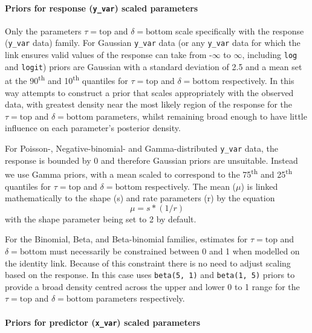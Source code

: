 \documentclass[
]{jss}
\begin{document}
\hypertarget{priors-for-response-y_var-scaled-parameters}{%
\paragraph{\texorpdfstring{Priors for response (\texttt{y\_var}) scaled
parameters}{Priors for response (y\_var) scaled parameters}}\label{priors-for-response-y_var-scaled-parameters}}

Only the parameters \(\tau = \text{top}\) and \(\delta = \text{bottom}\)
scale specifically with the response (\texttt{y\_var} data) family. For
Gaussian \texttt{y\_var} data (or any \texttt{y\_var} data for which the
link ensures valid values of the response can take from -\(\infty\) to
\(\infty\), including \texttt{log} and \texttt{logit}) priors are
Gaussian with a standard deviation of 2.5 and a mean set at the
90\textsuperscript{th} and 10\textsuperscript{th} quantiles for
\(\tau = \text{top}\) and \(\delta = \text{bottom}\) respectively. In
this way  attempts to construct a prior that scales
appropriately with the observed data, with greatest density near the
most likely region of the response for the \(\tau = \text{top}\) and
\(\delta = \text{bottom}\) parameters, whilst remaining broad enough to
have little influence on each parameter's posterior density.

For Poisson-, Negative-binomial- and Gamma-distributed \texttt{y\_var}
data, the response is bounded by 0 and therefore Gaussian priors are
unsuitable. Instead we use Gamma priors, with a mean scaled to
correspond to the 75\textsuperscript{th} and 25\textsuperscript{th}
quantiles for \(\tau = \text{top}\) and \(\delta = \text{bottom}\)
respectively. The mean (\(\mu\)) is linked mathematically to the shape
(s) and rate parameters (r) by the equation \[ \mu = s * (1/r) \] with
the shape parameter being set to 2 by default.

For the Binomial, Beta, and Beta-binomial families, estimates for
\(\tau = \text{top}\) and \(\delta = \text{bottom}\) must necessarily be
constrained between 0 and 1 when modelled on the identity link. Because
of this constraint there is no need to adjust scaling based on the
response. In this case  uses \texttt{beta(5,\ 1)} and
\texttt{beta(1,\ 5)} priors to provide a broad density centred across
the upper and lower 0 to 1 range for the \(\tau = \text{top}\) and
\(\delta = \text{bottom}\) parameters respectively.

\hypertarget{priors-for-predictor-x_var-scaled-parameters}{%
\paragraph{\texorpdfstring{Priors for predictor (\texttt{x\_var}) scaled
parameters}{Priors for predictor (x\_var) scaled parameters}}\label{priors-for-predictor-x_var-scaled-parameters}}
\end{document}
